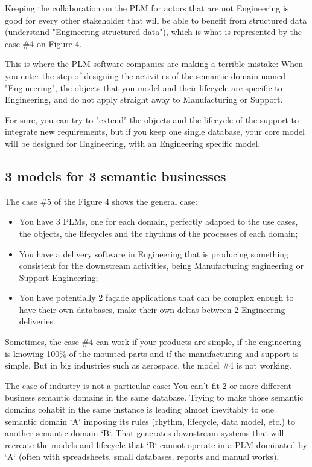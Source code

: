 \documentclass[]{article}
\begin{document}
Keeping the collaboration on the PLM for actors that are not Engineering is good for every other stakeholder that will be able to benefit from structured data (understand "Engineering structured data"), which is what is represented by the case \#4 on Figure 4.

This is where the PLM software companies are making a terrible mistake: When you enter the step of designing the activities of the semantic domain named "Engineering", the objects that you model and their lifecycle are specific to Engineering, and do not apply straight away to Manufacturing or Support.

For sure, you can try to "extend" the objects and the lifecycle of the support to integrate new requirements, but if you keep one single database, your core model will be designed for Engineering, with an Engineering specific model.

\subsection{3 models for 3 semantic businesses}

The case \#5 of the Figure 4 shows the general case:

\begin{itemize}
\item You have 3 PLMs, one for each domain, perfectly adapted to the use cases, the objects, the lifecycles and the rhythms of the processes of each domain;
\item You have a delivery software in Engineering that is producing something consistent for the downstream activities, being Manufacturing engineering or Support Engineering;
\item You have potentially 2 façade applications that can be complex enough to have their own databases, make their own deltas between 2 Engineering deliveries.
\end{itemize}

Sometimes, the case \#4 can work if your products are simple, if the engineering is knowing 100\% of the mounted parts and if the manufacturing and support is simple. But in big industries such as aerospace, the model \#4 is not working.

The case of industry is not a particular case: You can't fit 2 or more different business semantic domains in the same database. Trying to make those semantic domains cohabit in the same instance is leading almost inevitably to one semantic domain `A` imposing its rules (rhythm, lifecycle, data model, etc.) to another semantic domain `B`. That generates downstream systems that will recreate the models and lifecycle that `B` cannot operate in a PLM dominated by `A` (often with spreadsheets, small databases, reports and manual works).
\end{document}

